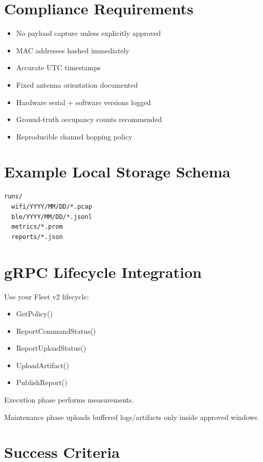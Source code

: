 \documentclass[11pt,a4paper]{article}
\begin{document}
\section{Compliance Requirements}

\begin{itemize}
\item No payload capture unless explicitly approved
\item MAC addresses hashed immediately
\item Accurate UTC timestamps
\item Fixed antenna orientation documented
\item Hardware serial + software versions logged
\item Ground-truth occupancy counts recommended
\item Reproducible channel hopping policy
\end{itemize}

\section{Example Local Storage Schema}

\begin{lstlisting}
runs/
  wifi/YYYY/MM/DD/*.pcap
  ble/YYYY/MM/DD/*.jsonl
  metrics/*.prom
  reports/*.json
\end{lstlisting}

\section{gRPC Lifecycle Integration}

Use your Fleet v2 lifecycle:

\begin{itemize}
\item GetPolicy()
\item ReportCommandStatus()
\item ReportUploadStatus()
\item UploadArtifact()
\item PublishReport()
\end{itemize}

Execution phase performs measurements.

Maintenance phase uploads buffered logs/artifacts only inside approved windows.

\section{Success Criteria}
\end{document}
